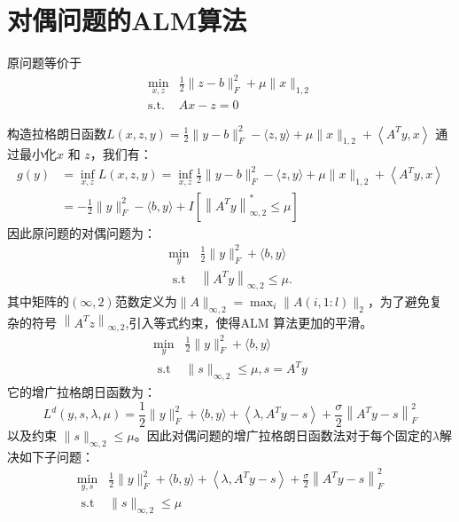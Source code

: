\documentclass[12pt]{article}
\begin{document}
 
 \section{对偶问题的ALM算法}
 原问题等价于
 \begin{equation*}
 	\begin{aligned}
 		\min \limits_{x,z}&  \frac{1}{2}\|z-b\|_F^2+\mu\|x\|_{1,2}\\
 		\text{s.t. }& Ax-z=0
 	\end{aligned}
 \end{equation*}

 构造拉格朗日函数$L(x,z,y) = \frac{1}{2}\|y-b\|_F^2-\langle z, y\rangle+\mu\|x\|_{1,2}+\left\langle A^T y, x\right\rangle $
 通过最小化$x$ 和 $z$，我们有：
 $$
 \begin{aligned}
 	g(y) & =\inf _{x, z} L(x, z, y)=\inf _{x, z}  \frac{1}{2}\|y-b\|_F^2-\langle z, y\rangle+\mu\|x\|_{1,2}+\left\langle A^T y, x\right\rangle \\
 	& =-\frac{1}{2}\|y\|_F^2-\langle b, y\rangle+I\left[\left\|A^T y\right\|_{\infty, 2}^* \leq \mu\right]
 \end{aligned}
 $$
 因此原问题的对偶问题为：
 $$
 \begin{array}{cl}
 	\min _y & \frac{1}{2}\|y\|_F^2+\langle b, y\rangle \\
 	\text { s.t } & \left\|A^T y\right\|_{\infty, 2} \leq \mu .
 \end{array}
 $$
其中矩阵的$(\infty, 2)$范数定义为$\|A\|_{\infty, 2}=\max _i\|A(i, 1: l)\|_2$，为了避免复杂的符号 $\left\|A^T z\right\|_{\infty, 2}$,引入等式约束，使得ALM 算法更加的平滑。
 $$
 \begin{array}{ll}
 	\min _y & \frac{1}{2}\|y\|_F^2+\langle b, y\rangle \\
 	\text { s.t } & \|s\|_{\infty, 2} \leq \mu, s=A^T y
 \end{array}
 $$
 它的增广拉格朗日函数为：
 $$
 L^d(y, s, \lambda, \mu)=\frac{1}{2}\|y\|_F^2+\langle b, y\rangle+\left\langle\lambda, A^T y-s\right\rangle+\frac{\sigma}{2}\left\|A^T y-s\right\|_F^2
 $$
 以及约束 $\|s\|_{\infty, 2} \leq \mu$。因此对偶问题的增广拉格朗日函数法对于每个固定的$\lambda$解决如下子问题：
 $$
 \begin{array}{ll}
 	\min _{y,s} & \frac{1}{2}\|y\|_F^2+\langle b, y\rangle+\left\langle\lambda, A^T y -s\right\rangle+\frac{\sigma}{2}\left\|A^T y -s\right\|_F^2 \\
 	\text { s.t } & \|s\|_{\infty, 2} \leq \mu
 \end{array}
 $$
\end{document}
